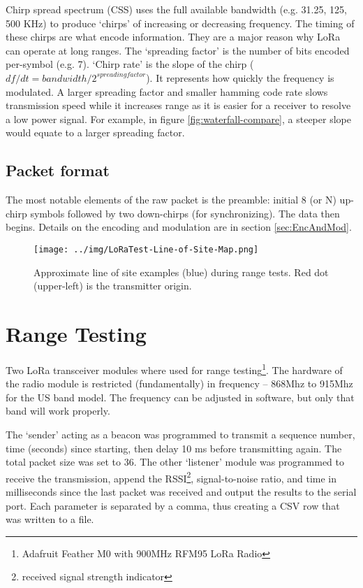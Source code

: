 \documentclass[conference, compsoc]{IEEEtran}
\begin{document}
Chirp spread spectrum (CSS) uses the full available bandwidth (e.g. 31.25, 125, 500 KHz) to produce `chirps' of increasing or decreasing frequency. The timing of these chirps are what encode information. They are a major reason why LoRa can operate at long ranges. The `spreading factor' is the number of bits encoded per-symbol (e.g. 7). `Chirp rate' is the slope of the chirp ($df/dt = bandwidth/2^{spreading factor}$). It represents how quickly the frequency is modulated. A larger spreading factor and smaller hamming code rate slows transmission speed while it increases range as it is easier for a receiver to resolve a low power signal. For example, in figure \ref{fig:waterfall-compare}, a steeper slope would equate to a larger spreading factor.

\subsection{Packet format}
The most notable elements of the raw packet is the preamble: initial 8 (or N) up-chirp symbols followed by two down-chirps (for synchronizing). The data then begins. Details on the encoding and modulation are in section \ref{sec:EncAndMod}.

\begin{figure}[htbp]
\begin{center}
\texttt{[image: ../img/LoRaTest-Line-of-Site-Map.png]}
\caption{Approximate line of site examples (blue) during range tests. Red dot (upper-left) is the transmitter origin.}
\label{line-of-site}
\end{center}
\end{figure}

\section{Range Testing}
Two LoRa transceiver modules where used for range testing\footnote{Adafruit Feather M0 with 900MHz RFM95 LoRa Radio}. The hardware of the radio module is restricted (fundamentally) in frequency -- 868Mhz to 915Mhz for the US band model. The frequency can be adjusted in software, but only that band will work properly.

The `sender' acting as a beacon was programmed to transmit a sequence number, time (seconds) since starting, then delay 10 ms before transmitting again. The total packet size was set to 36. The other `listener' module was programmed to receive the transmission, append the RSSI\footnote{received signal strength indicator}, signal-to-noise ratio, and time in milliseconds since the last packet was received and output the results to the serial port. Each parameter is separated by a comma, thus creating a CSV row that was written to a file.
\end{document}
